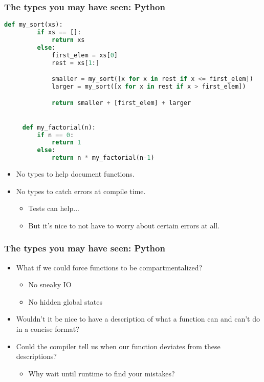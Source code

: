 \documentclass{beamer}
\begin{document}
\begin{frame}[fragile]
  \frametitle{The types you may have seen: Python}
  \begin{lstlisting}[frame=single, language=Python, breaklines=true, basicstyle=\ttfamily\tiny]
     def my_sort(xs):
         if xs == []:
             return xs
         else:
             first_elem = xs[0]
             rest = xs[1:]

             smaller = my_sort([x for x in rest if x <= first_elem])
             larger = my_sort([x for x in rest if x > first_elem])

             return smaller + [first_elem] + larger


     def my_factorial(n):
         if n == 0:
             return 1
         else:
             return n * my_factorial(n-1)
  \end{lstlisting}

  \pause
  \begin{itemize}
  \item No types to help document functions.

  \pause
  \item No types to catch errors at compile time.
    \begin{itemize}
    \pause
    \item Tests can help...
    \pause
    \item But it's nice to not have to worry about certain errors at all.
    \end{itemize}
  \end{itemize}
\end{frame}

\begin{frame}
  \frametitle{The types you may have seen: Python}

  \begin{itemize}
  \item What if we could force functions to be compartmentalized?
    \begin{itemize}
    \item No sneaky IO
    \item No hidden global states
    \end{itemize}
    
  \pause
  \item Wouldn't it be nice to have a description of what a function can and can't do in a concise format?

  \pause
  \item Could the compiler tell us when our function deviates from these descriptions?
    \begin{itemize}
    \item Why wait until runtime to find your mistakes?
    \end{itemize}

  \end{itemize}
\end{frame}
\end{document}
